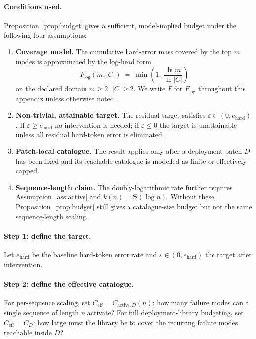 \documentclass{article}
\theoremstyle{taeplain}
\theoremstyle{taedefn}
\begin{document}
\paragraph{Conditions used.}
Proposition~\ref{prop:budget} gives a sufficient, model-implied budget under the following four assumptions:
\begin{enumerate}[leftmargin=1.8em,itemsep=0.25ex]
\item \textbf{Coverage model.} The cumulative hard-error mass covered by the top $m$ modes is approximated by the log-head form
\[
F_{\log}(m; |C|) \;=\; \min\!\left(1,\ \frac{\ln m}{\ln |C|}\right)
\]
on the declared domain $m \geq 2$, $|C| \geq 2$. We write $F$ for $F_{\log}$ throughout this appendix unless otherwise noted.
\item \textbf{Non-trivial, attainable target.} The residual target satisfies $\varepsilon \in (0, e_{\text{hard}})$. If $\varepsilon \geq e_{\text{hard}}$ no intervention is needed; if $\varepsilon \leq 0$ the target is unattainable unless all residual hard-token error is eliminated.
\item \textbf{Patch-local catalogue.} The result applies only after a deployment patch $D$ has been fixed and its reachable catalogue is modelled as finite or effectively capped.
\item \textbf{Sequence-length claim.} The doubly-logarithmic rate further requires Assumption~\ref{ass:active} and $k(n) = \Theta(\log n)$. Without these, Proposition~\ref{prop:budget} still gives a catalogue-size budget but not the same sequence-length scaling.
\end{enumerate}

\paragraph{Step 1: define the target.}
Let $e_{\text{hard}}$ be the baseline hard-token error rate and $\varepsilon \in (0, e_{\text{hard}})$ the target after intervention.

\paragraph{Step 2: define the effective catalogue.}
For per-sequence scaling, set $C_{\text{eff}} = C_{\text{active},D}(n)$: how many failure modes can a single sequence of length $n$ activate? For full deployment-library budgeting, set $C_{\text{eff}} = C_D$: how large must the library be to cover the recurring failure modes reachable inside $D$?
\end{document}
